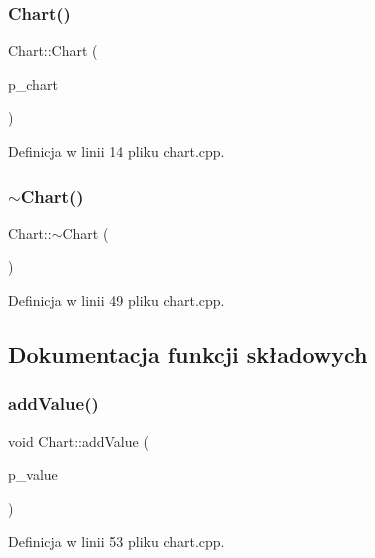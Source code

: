 \subsubsection{\texorpdfstring{Chart()}{Chart()}}
{\footnotesize\ttfamily Chart\+::\+Chart (\begin{DoxyParamCaption}\item[{Q\+Chart $\ast$}]{p\+\_\+chart }\end{DoxyParamCaption})}



Definicja w linii 14 pliku chart.\+cpp.

\mbox{\label{class_chart_a8a593f9f79c94057718d1c4942e77f86}} 
\subsubsection{\texorpdfstring{$\sim$\+Chart()}{~Chart()}}
{\footnotesize\ttfamily Chart\+::$\sim$\+Chart (\begin{DoxyParamCaption}{ }\end{DoxyParamCaption})\hspace{0.3cm}{\ttfamily [virtual]}}



Definicja w linii 49 pliku chart.\+cpp.



\subsection{Dokumentacja funkcji składowych}
\mbox{\label{class_chart_a3df426b79930e71f41f6177a0d08c3b2}} 
\subsubsection{\texorpdfstring{add\+Value()}{addValue()}}
{\footnotesize\ttfamily void Chart\+::add\+Value (\begin{DoxyParamCaption}\item[{float}]{p\+\_\+value }\end{DoxyParamCaption})}



Definicja w linii 53 pliku chart.\+cpp.

\mbox{\label{class_chart_ab9504951fa7890ec4a2973e0cbf877d5}} 

